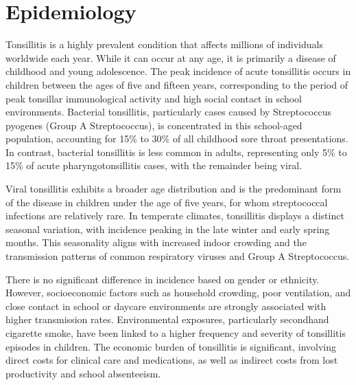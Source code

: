 \section*{Epidemiology}
Tonsillitis is a highly prevalent condition that affects millions of individuals worldwide each year. While it can occur at any age, it is primarily a disease of childhood and young adolescence. The peak incidence of acute tonsillitis occurs in children between the ages of five and fifteen years, corresponding to the period of peak tonsillar immunological activity and high social contact in school environments. Bacterial tonsillitis, particularly cases caused by Streptococcus pyogenes (Group A Streptococcus), is concentrated in this school-aged population, accounting for 15\% to 30\% of all childhood sore throat presentations. In contrast, bacterial tonsillitis is less common in adults, representing only 5\% to 15\% of acute pharyngotonsillitis cases, with the remainder being viral.

Viral tonsillitis exhibits a broader age distribution and is the predominant form of the disease in children under the age of five years, for whom streptococcal infections are relatively rare. In temperate climates, tonsillitis displays a distinct seasonal variation, with incidence peaking in the late winter and early spring months. This seasonality aligns with increased indoor crowding and the transmission patterns of common respiratory viruses and Group A Streptococcus.

There is no significant difference in incidence based on gender or ethnicity. However, socioeconomic factors such as household crowding, poor ventilation, and close contact in school or daycare environments are strongly associated with higher transmission rates. Environmental exposures, particularly secondhand cigarette smoke, have been linked to a higher frequency and severity of tonsillitis episodes in children. The economic burden of tonsillitis is significant, involving direct costs for clinical care and medications, as well as indirect costs from lost productivity and school absenteeism.

